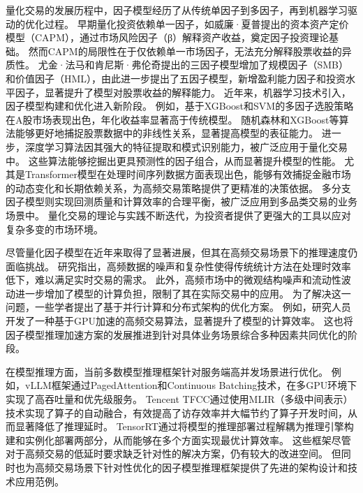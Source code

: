 量化交易的发展历程中，因子模型经历了从传统单因子到多因子，再到机器学习驱动的优化过程。
早期量化投资依赖单一因子，如威廉·夏普提出的资本资产定价模型（CAPM）\cite{sharpe1964capital}，通过市场风险因子（β）解释资产收益，奠定因子投资理论基础。
然而CAPM的局限性在于仅依赖单一市场因子，无法充分解释股票收益的异质性。
尤金·法马和肯尼斯·弗伦奇提出的三因子模型\cite{fama1993common}增加了规模因子（SMB）和价值因子（HML），由此进一步提出了五因子模型\cite{fama2015five}，新增盈利能力因子和投资水平因子，显著提升了模型对股票收益的解释能力。
近年来，机器学习技术引入，因子模型构建和优化进入新阶段。
例如，基于XGBoost和SVM的多因子选股策略在A股市场表现出色，年化收益率显著高于传统模型\cite{bianchi2021bond}。
随机森林和XGBoost等算法能够更好地捕捉股票数据中的非线性关系\cite{gu2021autoencoder}，显著提高模型的表征能力。
进一步，深度学习算法因其强大的特征提取和模式识别能力，被广泛应用于量化交易中\cite{chen2024deep}。
这些算法能够挖掘出更具预测性的因子组合\cite{kozak2020shrinking}，从而显著提升模型的性能。
尤其是Transformer模型在处理时间序列数据方面表现出色，能够有效捕捉金融市场的动态变化和长期依赖关系，为高频交易策略提供了更精准的决策依据\cite{barez2023exploringadvantagestransformershighfrequency}。
多分支因子模型则实现回测质量和计算效率的合理平衡，被广泛应用到多品类交易的业务场景中。
量化交易的理论与实践不断迭代，为投资者提供了更强大的工具以应对复杂多变的市场环境。

尽管量化因子模型在近年来取得了显著进展，但其在高频交易场景下的推理速度仍面临挑战。
研究指出\cite{hansen2006realized}，高频数据的噪声和复杂性使得传统统计方法在处理时效率低下，难以满足实时交易的需求。
此外，高频市场中的微观结构噪声和流动性波动进一步增加了模型的计算负担，限制了其在实际交易中的应用。
为了解决这一问题，一些学者提出了基于并行计算和分布式架构的优化方案。
例如，研究人员开发了一种基于GPU加速的高频交易算法\cite{frey2023jax}，显著提升了模型的计算效率。
这也将因子模型推理加速方案的发展推进到针对具体业务场景综合多种因素共同优化的阶段。

在模型推理方面，当前多数模型推理框架针对服务端高并发场景进行优化。
例如，vLLM框架通过PagedAttention和Continuous Batching技术，在多GPU环境下实现了高吞吐量和优先级服务\cite{kwon2023efficientmemorymanagementlarge}。
Tencent TFCC通过使用MLIR（多级中间表示）技术实现了算子的自动融合，有效提高了访存效率并大幅节约了算子开发时间，从而显著降低了推理延时\cite{lattner2020mlircompilerinfrastructureend}。
TensorRT通过将模型的推理部署过程解耦为推理引擎构建和实例化部署两部分，从而能够在多个方面实现最优计算效率。
这些框架尽管对于高频交易的低延时要求缺乏针对性的解决方案，仍有较大的改进空间。
但同时也为高频交易场景下针对性优化的因子模型推理框架提供了先进的架构设计和技术应用范例。

